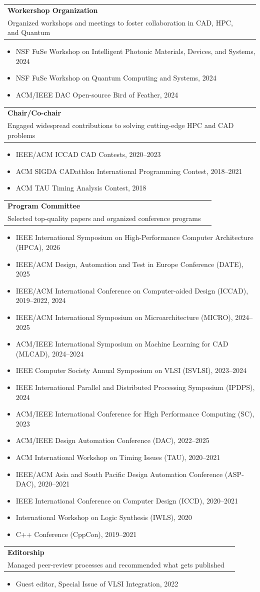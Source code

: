 \documentclass[A4,11pt]{article}
\makeatletter
\newcommand{\CVItem}[1]{
  \item\small{
    {#1 \vspace{-2pt}}
  }
}
\newcommand{\CVSubheading}[4]{
  \vspace{-2pt}\item
    \begin{tabular*}{0.97\textwidth}[t]{l@{\extracolsep{\fill}}r}
      \textbf{#1} & #2 \\
      \small#3 & \small #4 \\
    \end{tabular*}\vspace{-7pt}
}
\newcommand{\CVItemListStart}{\begin{itemize}}
\newcommand{\CVItemListEnd}{\end{itemize}\vspace{-5pt}}
\makeatother
\begin{document}
    \CVSubheading
      {Workershop Organization}{}
      {Organized workshops and meetings to foster collaboration in CAD, HPC, and Quantum}{}
      \CVItemListStart
        \CVItem{NSF FuSe Workshop on Intelligent Photonic Materials, Devices, and Systems, 2024}
        \CVItem{NSF FuSe Workshop on Quantum Computing and Systems, 2024}
        \CVItem{ACM/IEEE DAC Open-source Bird of Feather, 2024}
      \CVItemListEnd
    
    \CVSubheading
      {Chair/Co-chair}{}
      {Engaged widespread contributions to solving cutting-edge HPC and CAD problems}{}
      \CVItemListStart
        \CVItem{IEEE/ACM ICCAD CAD Contests, 2020--2023}
        \CVItem{ACM SIGDA CADathlon International Programming Contest, 2018--2021}
        \CVItem{ACM TAU Timing Analysis Contest, 2018}
      \CVItemListEnd
     
    \CVSubheading
      {Program Committee}{}
      {Selected top-quality papers and organized conference programs}{}
      \CVItemListStart
        \CVItem{IEEE International Symposium on High-Performance Computer Architecture (HPCA), 2026}
        \CVItem{IEEE/ACM Design, Automation and Test in Europe Conference (DATE), 2025}
        \CVItem{IEEE/ACM International Conference on Computer-aided Design (ICCAD), 2019--2022, 2024}
        \CVItem{IEEE/ACM International Symposium on Microarchitecture (MICRO), 2024--2025}
        \CVItem{ACM/IEEE International Symposium on Machine Learning for CAD (MLCAD), 2024--2024}
        \CVItem{IEEE Computer Society Annual Symposium on VLSI (ISVLSI), 2023--2024}
        \CVItem{IEEE International Parallel and Distributed Processing Symposium (IPDPS), 2024}
        \CVItem{ACM/IEEE International Conference for High Performance Computing (SC), 2023}
        \CVItem{ACM/IEEE Design Automation Conference (DAC), 2022--2025}
        \CVItem{ACM International Workshop on Timing Issues (TAU), 2020--2021}
        \CVItem{IEEE/ACM Asia and South Pacific Design Automation Conference (ASP-DAC), 2020--2021}
        \CVItem{IEEE International Conference on Computer Design (ICCD), 2020--2021}
        \CVItem{International Workshop on Logic Synthesis (IWLS), 2020}
        \CVItem{C++ Conference (CppCon), 2019--2021}
      \CVItemListEnd
    
    \CVSubheading
      {Editorship}{}
      {Managed peer-review processes and recommended what gets published}{}
      \CVItemListStart
        \CVItem{Guest editor, Special Issue of VLSI Integration, 2022}
      \CVItemListEnd
    
\end{document}
